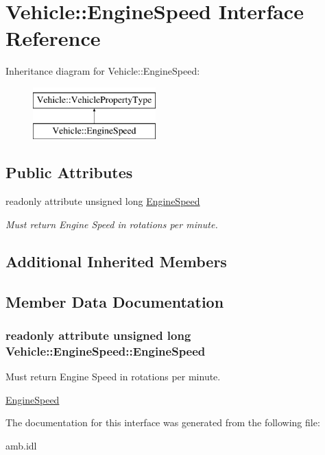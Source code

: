 \hypertarget{interfaceVehicle_1_1EngineSpeed}{\section{Vehicle\-:\-:Engine\-Speed Interface Reference}
\label{interfaceVehicle_1_1EngineSpeed}
}
Inheritance diagram for Vehicle\-:\-:Engine\-Speed\-:\begin{figure}[H]
\begin{center}
\leavevmode
\includegraphics[height=2.000000cm]{interfaceVehicle_1_1EngineSpeed}
\end{center}
\end{figure}
\subsection*{Public Attributes}
\begin{DoxyCompactItemize}
\item 
readonly attribute unsigned long \hyperlink{interfaceVehicle_1_1EngineSpeed_a9f2830585cedd96301ecd4ca1fc67359}{Engine\-Speed}
\begin{DoxyCompactList}\small\item\em Must return Engine Speed in rotations per minute. \end{DoxyCompactList}\end{DoxyCompactItemize}
\subsection*{Additional Inherited Members}


\subsection{Member Data Documentation}
\hypertarget{interfaceVehicle_1_1EngineSpeed_a9f2830585cedd96301ecd4ca1fc67359}{
\subsubsection[{Engine\-Speed}]{\setlength{\rightskip}{0pt plus 5cm}readonly attribute unsigned long Vehicle\-::\-Engine\-Speed\-::\-Engine\-Speed}}\label{interfaceVehicle_1_1EngineSpeed_a9f2830585cedd96301ecd4ca1fc67359}


Must return Engine Speed in rotations per minute. 

\hyperlink{interfaceVehicle_1_1EngineSpeed}{Engine\-Speed} 

The documentation for this interface was generated from the following file\-:\begin{DoxyCompactItemize}
\item 
amb.\-idl\end{DoxyCompactItemize}
